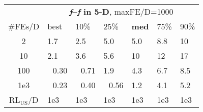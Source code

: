\begin{tabular}{c|llllll}
 & \multicolumn{6}{|c}{\textbf{\textit{f}\raisebox{-0.35ex}{1}--\textit{f}\raisebox{-0.35ex}{55} in 5-D}, maxFE/D=1000}\\
\#FEs/D & best & 10\% & 25\% & \textbf{med} & 75\% & 90\%\\
2 & \hspace*{1ex}1.7 & \hspace*{1ex}2.5 & \hspace*{1ex}5.0 & \hspace*{1ex}5.0 & \hspace*{1ex}8.8 & 10\\
10 & \hspace*{1ex}2.1 & \hspace*{1ex}3.6 & \hspace*{1ex}5.6 & 10 & 12 & 17\\
100 & ~\,0.30 & ~\,0.71 & \hspace*{1ex}1.9 & \hspace*{1ex}4.3 & \hspace*{1ex}6.7 & \hspace*{1ex}8.5\\
1e3 & ~\,0.23 & ~\,0.40 & ~\,0.56 & \hspace*{1ex}1.2 & \hspace*{1ex}4.1 & \hspace*{1ex}5.2\\
$\text{RL}_{\text{US}}$/D & 1e3 & 1e3 & 1e3 & 1e3 & 1e3 & 1e3
\end{tabular}
